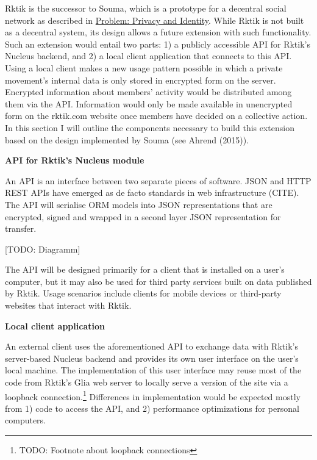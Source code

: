 
Rktik is the successor to Souma, which is a prototype for a decentral
social network as described in
\hyperref[problem-privacy-and-identity]{Problem: Privacy and Identity}.
While Rktik is not built as a decentral system, its design allows a
future extension with such functionality. Such an extension would entail
two parts: 1) a publicly accessible API for Rktik's Nucleus backend, and
2) a local client application that connects to this API. Using a local
client makes a new usage pattern possible in which a private movement's
internal data is only stored in encrypted form on the server. Encrypted
information about members' activity would be distributed among them via
the API. Information would only be made available in unencrypted form on
the rktik.com website once members have decided on a collective action.
In this section I will outline the components necessary to build this
extension based on the design implemented by Souma (see Ahrend (2015)).

\textbf{API for Rktik's Nucleus module}

An API is an interface between two separate pieces of software. JSON and
HTTP REST APIs have emerged as de facto standards in web infrastructure
(CITE). The API will serialise ORM models into JSON representations that
are encrypted, signed and wrapped in a second layer JSON representation
for transfer.

{[}TODO: Diagramm{]}

The API will be designed primarily for a client that is installed on a
user's computer, but it may also be used for third party services built
on data published by Rktik. Usage scenarios include clients for mobile
devices or third-party websites that interact with Rktik.

\textbf{Local client application}

An external client uses the aforementioned API to exchange data with
Rktik's server-based Nucleus backend and provides its own user interface
on the user's local machine. The implementation of this user interface
may reuse most of the code from Rktik's Glia web server to locally serve
a version of the site via a loopback connection.\footnote{TODO: Footnote
  about loopback connections} Differences in implementation would be
expected mostly from 1) code to access the API, and 2) performance
optimizations for personal computers.

